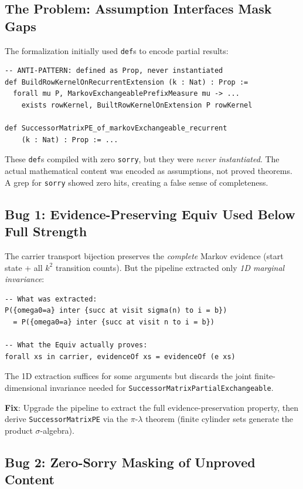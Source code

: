 \documentclass[11pt,a4paper]{article}
\theoremstyle{definition}
\begin{document}
\subsection{The Problem: Assumption Interfaces Mask Gaps}

The formalization initially used \texttt{def}s to encode partial results:

\begin{lstlisting}
-- ANTI-PATTERN: defined as Prop, never instantiated
def BuildRowKernelOnRecurrentExtension (k : Nat) : Prop :=
  forall mu P, MarkovExchangeablePrefixMeasure mu -> ...
    exists rowKernel, BuiltRowKernelOnExtension P rowKernel

def SuccessorMatrixPE_of_markovExchangeable_recurrent
    (k : Nat) : Prop := ...
\end{lstlisting}

These \texttt{def}s compiled with zero \texttt{sorry}, but they were
\emph{never instantiated}. The actual mathematical content was encoded
as assumptions, not proved theorems. A grep for \texttt{sorry} showed
zero hits, creating a false sense of completeness.

\subsection{Bug 1: Evidence-Preserving Equiv Used Below Full Strength}

The carrier transport bijection preserves the \emph{complete} Markov
evidence (start state + all $k^2$ transition counts). But the pipeline
extracted only \emph{1D marginal invariance}:

\begin{lstlisting}
-- What was extracted:
P({omega0=a} inter {succ at visit sigma(n) to i = b})
  = P({omega0=a} inter {succ at visit n to i = b})

-- What the Equiv actually proves:
forall xs in carrier, evidenceOf xs = evidenceOf (e xs)
\end{lstlisting}

The 1D extraction suffices for some arguments but discards the joint
finite-dimensional invariance needed for \texttt{SuccessorMatrixPartialExchangeable}.

\textbf{Fix}: Upgrade the pipeline to extract the full evidence-preservation
property, then derive \texttt{SuccessorMatrixPE} via the $\pi$-$\lambda$
theorem (finite cylinder sets generate the product $\sigma$-algebra).

\subsection{Bug 2: Zero-Sorry Masking of Unproved Content}
\end{document}
